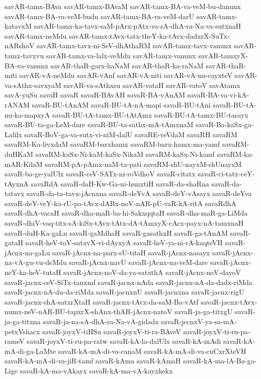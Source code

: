 {savAR-tamx-BAva
savAR-tamx-BAvaM
savAR-tamx-BA-va-veM-bu-danunx
savAR-tamx-BA-va-veM-budu
savAR-tamx-BA-va-veM-darU
savAR-tamx-katavxM
savAR-tamx-ka-tavx-saM-pArx-pAtx-va-sA-dhA-ra-Na-va-sutxnaH
savAR-tamx-neMdu
savAR-tamx-tAvx-tatx-theY-ka-tAvx-dadxrX-SuTx-nARshoV
savAR-tamx-tavx-ni-SeV-dhAthaRM
savAR-tamx-tavx-vanunx
savAR-tamx-tavxvu
savAR-tamx-va-lalx-veMdu
savAR-tamx-vanunx
savAR-tamxyX-BA-va-vanunx
savAR-thaR-garx-haNaM
savAR-thaR-ka-raNaM
savAR-thaR-miti
savAR-vA-neMdu
savAR-vAnf
savAR-vA-niti
savAR-vA-nu-cayxteV
savAR-va-sAthx-savxyaM
savAR-va-sAthxsu
savAR-vataH
savAR-vatoV
savAtamx
savA-yuSu
savaH
savaR
savaR-BAvAH
savaR-BA-vAnAM
savaR-BA-va-vi-kA-rANAM
savaR-BU-tAnAM
savaR-BU-tA-nA-mapi
savaR-BU-tAni
savaR-BU-tA-nu-ka-mapxyA
savaR-BU-tA-tamx-BU-tAtAmx
savaR-BU-tA-tamx-BU-tasayx
savaR-BU-ta-ga-LeM-dare
savaR-BU-ta-sathx-mA-tAmxnaM
savaR-Ba-kaSx-ga-Lalilx
savaR-BoV-ga-va-sutx-vi-niM-dalU
savaRE-veVdaM
savaRH
savaRM
savaRM-Ka-livxdaM
savaRM-barxhamx
savaRM-barx-hamx-ma-yamf
savaRM-duHKaM
savaRM-kaSx-Ni-kaM-kaSx-NikaM
savaRM-kaSx-Ni-kamf
savaRM-ka-mAR-KilaM
savaRM-pA-pAmx-naM-ta-pati
savaRM-shU-nayxM-shUnayxM
savaR-ba-ge-yalUlx
savaR-ceV-SATx-ni-roVdhoV
savaR-citatx
savaR-ci-tatx-ceY-tAyxnA
savaRdA
savaR-daH-Kw-Ga-ni-hunxtiH
savaR-da-shaRna
savaR-da-tatavx
savaR-da-ta-tavx-jAcnxna
savaR-deYvA
savaR-deY-vAsayx
savaR-deYva
savaR-deY-veY-ka-rU-pa-tAvx-dABx-noV-nAR-pU-vaR-kA-ritA
savaRdhA
savaR-dhA-vacaH
savaR-dha-maR-ba-hi-SakxqqtaH
savaR-dha-maR-ga-LiMda
savaR-dhiV-vaq-titx-sA-kiSx-tAvx-tAtx-dA-tAmxyX-cAcx-payx-nA-tamxnaH
savaR-duH-Ka-gaLu
savaR-gaMdhaH
savaR-gasathxH
savaR-ga-tAnAM
savaR-gataH
savaR-heV-toV-satxvX-vi-dAyxyA
savaR-heV-ya-ni-rA-kaqteVH
savaR-jAcnx-na-gaLu
savaR-jAcnx-na-parx-sU-titaH
savaR-jAcnx-nasayx
savaR-jAcnx-na-vA-gu-vu-deMdu
savaR-jAcnx-navU
savaR-jAcnx-na-veM-dare
savaR-jAcnx-neY-ka-heV-tutaH
savaR-jAcnx-noV-da-ya-satxthA
savaR-jAcnx-noV-dayoV
savaR-jacnx-ceV-SiTx-tanxmf
savaR-jacnx-nAda
savaR-jacnx-nA-da-dadx-riMda
savaR-jacnx-nA-du-da-riMda
savaR-jacnxnU
savaR-jacnxna
savaR-jacnx-rigU
savaR-jacnx-shA-satxrXtaH
savaR-jacnx-tAvx-da-saM-Ba-vAtf
savaR-jacnx-tAvx-numx-neV-nAR-BU-tapxrX-shAnx-thAR-jAcnx-natoV
savaR-ja-ga-titxgU
savaR-ja-ga-titxna
savaR-ja-na-sA-dhA-ra-Na-vA-gidadx
savaR-jecnxV-ya-sa-mA-petxVshacx
savaR-joyxV-tiHSu
savaR-joyxV-ti-ra-BAveV
savaR-joyxV-ti-ru-pa-rameV
savaR-joyxV-ti-ru-pa-ratw
savaR-kA-la-dalUlx
savaR-kA-mAdi
savaR-kA-mA-di-ga-LaMte
savaR-kA-mA-di-va-canaM
savaR-kA-mA-di-va-cuCxrXteVH
savaR-kA-mA-di-va-jiR-tamf
savaR-kAma
savaR-kAmaH
savaR-kA-ma-lA-Ba-ga-Lige
savaR-kA-ma-vAkayx
savaR-kA-ma-vA-kayxkekx
}

